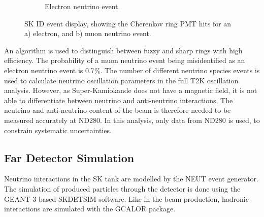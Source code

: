 \begin{figure}
\begin{subfigure}{.5\textwidth}
  \caption{Electron neutrino event.}
  \label{fig:skeventdisplaymuon}
\end{subfigure}
\caption{SK ID event display, showing the Cherenkov ring PMT hits for an a) electron, and b) muon neutrino event. }
\label{fig:skeventdisplay}
\end{figure}

An algorithm\cite{skrecoalg} is used to distinguish between fuzzy and sharp rings with high efficiency. The probability of a muon neutrino event being misidentified as an electron neutrino event is 0.7$\%$. The number of different neutrino species events is used to calculate neutrino oscillation parameters in the full T2K oscillation analysis. However, as Super-Kamiokande does not have a magnetic field, it is not able to differentiate between neutrino and anti-neutrino interactions. The neutrino and anti-neutrino content of the beam is therefore needed to be measured accurately at ND280. In this analysis, only data from ND280 is used, to constrain systematic uncertainties.

\subsection{Far Detector Simulation}

Neutrino interactions in the SK tank are modelled by the NEUT event generator. The simulation of produced particles through the detector is done using the GEANT-3\cite{geant3} based SKDETSIM software. Like in the beam production, hadronic interactions are simulated with the GCALOR package.

\newpage